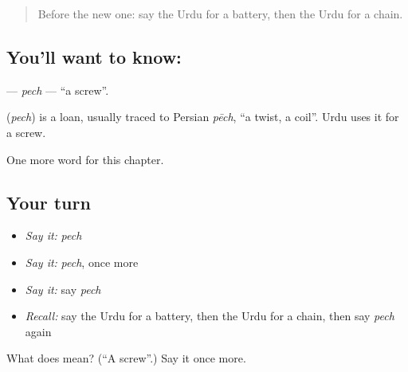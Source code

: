 \label{lesson:UR-C232-pech}



\begin{quote}
Before the new one: say the Urdu for a battery, then the Urdu for a chain.
\end{quote}

\subsection*{You'll want to know: }
\textbf{} — \emph{pech} — \textquotedblleft{}a screw\textquotedblright{}.

\begin{cousinweb}
\textbf{} (\emph{pech}) is a loan, usually traced to Persian \emph{pēch}, \textquotedblleft{}a twist, a coil\textquotedblright{}. Urdu uses it for a screw.
\end{cousinweb}

\begin{grammarlens}[title={What you've built}]
One more word for this chapter.
\end{grammarlens}

\subsection*{Your turn}
\begin{itemize}
\raggedright
  \item \emph{Say it:} \emph{pech}
  \item \emph{Say it:} \emph{pech}, once more
  \item \emph{Say it:} say \emph{pech}
  \item \emph{Recall:} say the Urdu for a battery, then the Urdu for a chain, then say \emph{pech} again
\end{itemize}

\begin{tcolorbox}[breakable,colback=teal!4,colframe=teal!35!black,title={Before you move on}]
What does  mean? (\textquotedblleft{}A screw\textquotedblright{}.) Say it once more.
\end{tcolorbox}
